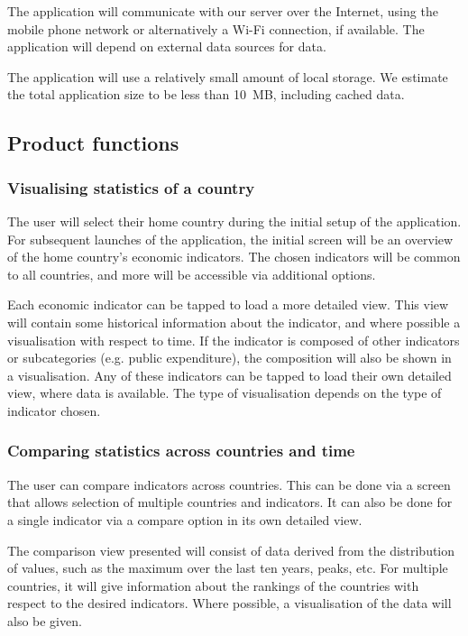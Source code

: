 \documentclass[12pt,a4paper,twoside]{article}
\begin{document}
The application will communicate with our server over the Internet, using the mobile phone network or alternatively a Wi-Fi connection, if available. The application will depend on external data sources for data.

The application will use a relatively small amount of local storage. We estimate the total application size to be less than 10~MB, including cached data.

\subsection{Product functions}

\subsubsection{Visualising statistics of a country}
The user will select their home country during the initial setup of the application. For subsequent launches of the application, the initial screen will be an overview of the home country's economic indicators. The chosen indicators will be common to all countries, and more will be accessible via additional options.

Each economic indicator can be tapped to load a more detailed view. This view will contain some historical information about the indicator, and where possible a visualisation with respect to time. If the indicator is composed of other indicators or subcategories (e.g. public expenditure), the composition will also be shown in a visualisation. Any of these indicators can be tapped to load their own detailed view, where data is available. The type of visualisation depends on the type of indicator chosen.

\subsubsection{Comparing statistics across countries and time}
The user can compare indicators across countries. This can be done via a screen that allows selection of multiple countries and indicators. It can also be done for a single indicator via a compare option in its own detailed view.

The comparison view presented will consist of data derived from the distribution of values, such as the maximum over the last ten years, peaks, etc. For multiple countries, it will give information about the rankings of the countries with respect to the desired indicators. Where possible, a visualisation of the data will also be given.
\end{document}
